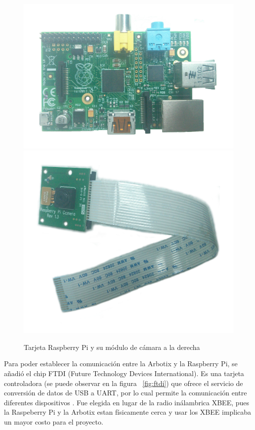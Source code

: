 \begin{figure}[hbtp]
\centering
\includegraphics[scale=0.06]{imagenes/RaspberryPi.jpg}
\includegraphics[scale=0.06]{imagenes/CamRasp.jpg}
\caption{Tarjeta Raspberry Pi y su módulo de cámara a la derecha}
\label{fig:RaspYcamara}
\end{figure}

Para poder establecer la comunicación entre la Arbotix y la Raspberry Pi, se añadió el chip FTDI (Future Technology Devices International). Es una tarjeta controladora  (se puede observar en la figura ~\ref{fig:ftdi}) que ofrece el servicio de conversión de  datos de \gls{USB} a \gls{UART}, por lo cual permite la comunicación entre diferentes dispositivos \cite{ftdi}. Fue elegida en lugar de la radio inálambrica \gls{XBEE}, pues la Raspeberry Pi y la Arbotix estan f\'isicamente cerca y usar los \gls{XBEE} implicaba un mayor costo para el proyecto.

